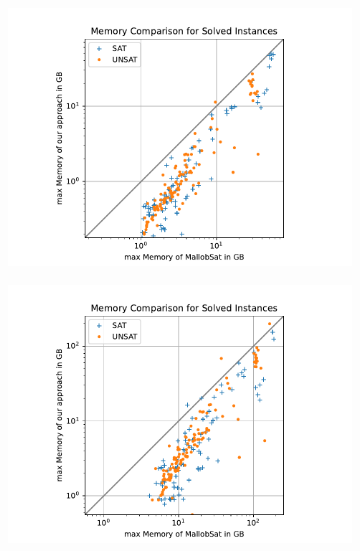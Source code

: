 \documentclass[12pt,a4paper,twoside]{scrartcl}
\numberwithin{equation}{section}
\begin{document}
\begin{figure}
  \center
  \begin{subfigure}[c]{.45\textwidth}
    \center
    \includegraphics[scale=.45]{plots/square_mem_compare/square_mem_1node.pdf}
    \label{fig:memCompare1node}
  \end{subfigure}
  \begin{subfigure}[c]{.45\textwidth}
    \center
    \includegraphics[scale=.45]{plots/square_mem_compare/square_mem_4node.pdf}
    \label{fig:memCompare4node}
  \end{subfigure}
  \begin{subfigure}[c]{.45\textwidth}
    \center

\end{subfigure}
\end{figure}
\end{document}
